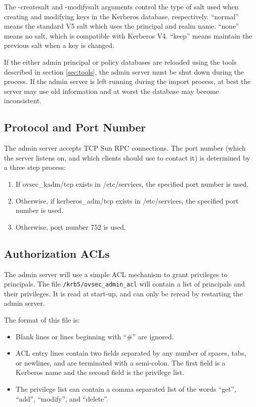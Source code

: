The -createsalt and -modifysalt arguments control the type of salt
used when creating and modifying keys in the Kerberos database,
respectively.  ``normal'' means the standard V5 salt which uses the
principal and realm name.  ``none'' means no salt, which is compatible
with Kerberos V4.  ``keep'' means maintain the previous salt when a
key is changed.

If the either admin principal or policy databases are reloaded using
the tools described in section \ref{sec:tools}, the admin server must
be shut down during the process.  If the admin server is left running
during the import process, at best the server may use old information
and at worst the database may become inconsistent.

\subsection{Protocol and Port Number}

The admin server accepts TCP Sun RPC connections.  The port number
(which the server listens on, and which clients should use to contact
it) is determined by a three step process:

\begin{enumerate}
\item If ovsec_kadm/tcp exists in /etc/services, the specified port
number is used.

\item Otherwise, if kerberos_adm/tcp exists in /etc/services, the
specified port number is used.

\item Otherwise, port number 752 is used.
\end{enumerate}

\subsection{Authorization ACLs}
\label{sec:acls}

The admin server will use a simple ACL mechanism to grant privileges
to principals.  The file {\tt /krb5/ovsec_admin_acl} will contain a
list of principals and their privileges.  It is read at start-up, and
can only be reread by restarting the admin server.

The format of this file is:

\begin{itemize}
\item Blank lines or lines beginning with ``\#'' are ignored.

\item ACL entry lines contain two fields separated by any number of
spaces, tabs, or newlines, and are terminated with a semi-colon.  The
first field is a Kerberos name and the second field is the privilege
list.

\item The privilege list can contain a comma separated list of the
words ``get'', ``add'', ``modify'', and ``delete''.
\end{itemize}

